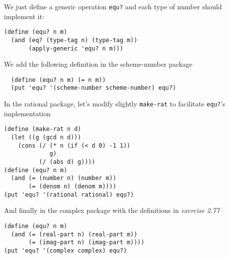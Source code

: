 \documentclass[a4paper,12pt]{article}
\begin{document}
We just define a generic operation \lstinline!equ?! and each type of
number should implement it:
\begin{lstlisting}
(define (equ? n m)
  (and (eq? (type-tag n) (type-tag m))
       (apply-generic 'equ? n m)))
\end{lstlisting}

We add the following definition in the scheme-number package
\begin{lstlisting}
  (define (equ? n m) (= n m))
  (put 'equ? '(scheme-number scheme-number) equ?)
\end{lstlisting}
In the rational package, let's modify slightly \lstinline!make-rat! to
facilitate \lstinline!equ?!'s implementation
\begin{lstlisting}
(define (make-rat n d)
  (let ((g (gcd n d)))
    (cons (/ (* n (if (< d 0) -1 1))
             g)
          (/ (abs d) g))))
(define (equ? n m)
  (and (= (number n) (number m))
       (= (denom n) (denom m))))
(put 'equ? '(rational rational) equ?)
\end{lstlisting}
And finally in the complex package with the definitions in \emph{exercise 2.77}
\begin{lstlisting}
(define (equ? n m)
  (and (= (real-part n) (real-part m))
       (= (imag-part n) (imag-part m))))
(put 'equ? '(complex complex) equ?)
\end{lstlisting}
\end{document}
